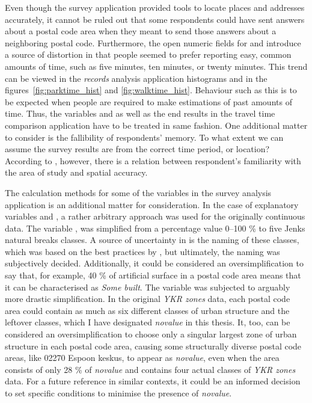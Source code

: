 Even though the survey application provided tools to locate places and addresses accurately, it cannot be ruled out that some respondents could have sent answers about a postal code area when they meant to send those answers about a neighboring postal code. Furthermore, the open numeric fields for  and  introduce a source of distortion in that people seemed to prefer reporting easy, common amounts of time, such as five minutes, ten minutes, or twenty minutes. This trend can be viewed in the \textit{records} analysis application histograms and in the figures~\ref{fig:parktime_hist} and \ref{fig:walktime_hist}. Behaviour such as this is to be expected when people are required to make estimations of past amounts of time. Thus, the variables  and  as well as the end results in the travel time comparison application have to be treated in same fashion. One additional matter to consider is the fallibility of respondents' memory. To what extent we can assume the survey results are from the correct time period, or location? According to , however, there is a relation between respondent's familiarity with the area of study and spatial accuracy. 

The calculation methods for some of the variables in the survey analysis application is an additional matter for consideration. In the case of explanatory variables  and , a rather arbitrary approach was used for the originally continuous data. The variable , was simplified from a percentage value 0--100 \% to five Jenks natural breaks classes. A source of uncertainty in  is the naming of these classes, which was based on the best practices by , but ultimately, the naming was subjectively decided. Additionally, it could be considered an oversimplification to say that, for example, 40 \% of artificial surface in a postal code area means that it can be characterised as \textit{Some built}. The variable  was subjected to arguably more drastic simplification. In the original \textit{YKR zones} data, each postal code area could contain as much as six different classes of urban structure and the leftover classes, which I have designated \textit{novalue} in this thesis. It, too, can be considered an oversimplification to choose only a singular largest zone of urban structure in each postal code area, causing some structurally diverse postal code areas, like 02270 Espoon keskus, to appear as \textit{novalue}, even when the area consists of only 28 \% of \textit{novalue} and contains four actual classes of \textit{YKR zones} data. For a future reference in similar contexts, it could be an informed decision to set specific conditions to minimise the presence of \textit{novalue}.


